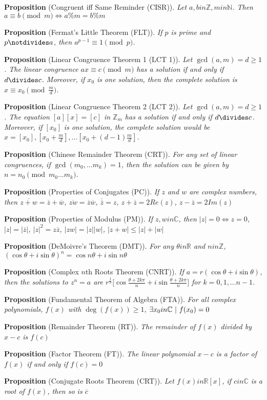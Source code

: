 \documentclass[12pt]{article}
\newcommand{\propositionlist}[2]{{\bf Proposition} (#1). \emph{#2}}
\begin{document}
\propositionlist{Congruent iff Same Reminder (CISR)}{Let $a,b in \mathbb{Z}, m in \mathbb{N}$. Then $a \equiv b \pmod m \iff a \% m = b \% m$}

\propositionlist{Fermat's Little Theorem (FLT)}{If $p$ is prime and $p \notdivides a$, then $a^{p-1} \equiv 1 \pmod p$.}

\propositionlist{Linear Congruence Theorem 1 (LCT 1)}{Let $\gcd(a,m) = d \geq 1$. The linear congruence $ax \equiv c \pmod m$ has a solution if and only if $d \divides c$. Moreover, if $x_0$ is one solution, then the complete solution is $x \equiv x_0 \pmod \frac{m}{d}$.}

\propositionlist{Linear Congruence Theorem 2 (LCT 2)}{Let $\gcd(a,m) = d \geq 1$. The equation $[a][x] = [c]$ in $\mathbb{Z}_m$ has a solution if and only if $d \divides c$. Moreover, if $[x_0]$ is one solution, the complete solution would be $x = [x_0], [x_0 + \frac{m}{d}], ... [x_0 + (d-1)\frac{m}{d}]$.}

\propositionlist{Chinese Remainder Theorem (CRT)}{For any set of linear congruences, if $\gcd(m_0,...m_k) = 1$, then the solution can be given by $n = n_0 \pmod {m_0...m_k}$.}

\propositionlist{Properties of Conjugates (PC)}{If $z$ and $w$ are complex numbers, then $\overline{z + w} = \overline{z} + \overline{w}$, $\overline{zw} = \overline{z}\overline{w}$, $\overline{\overline{z}} = z$, $z + \overline{z} = 2Re(z)$, $z - \overline{z} = 2Im(z)$}

\propositionlist{Properties of Modulus (PM)}{If $z, w in \mathbb{C}$, then $|z| = 0 \iff z = 0$, $|z| = |\overline{z}|$, ${|z|}^2 = z\overline{z}$, $|zw| = |z||w|$, $|z+w| \leq |z| + |w|$}

\propositionlist{DeMoivre's Theorem (DMT)}{For any $\theta in \mathbb{R}$ and $n in \mathbb{Z}$, $(\cos\theta + i\sin\theta)^n = \cos n\theta + i\sin n\theta$}

\propositionlist{Complex $n$th Roots Theorem (CNRT)}{If $a = r(\cos\theta + i\sin\theta)$, then the solutions to $z^n = a$ are $r^\frac{1}{n} \bigg[ \cos\frac{\theta + 2k\pi}{n} + i\sin\frac{\theta + 2k\pi}{n} \bigg]$ for $k = 0, 1, ... n-1$.}

\propositionlist{Fundamental Theorem of Algebra (FTA)}{For all complex polynomials, $f(x)$ with $\deg(f(x)) \geq 1$, $\exists x_0 in \mathbb{C} \ |\  f(x_0) = 0$}

\propositionlist{Remainder Theorem (RT)}{The remainder of $f(x)$ divided by $x-c$ is $f(c)$}

\propositionlist{Factor Theorem (FT)}{The linear polynomial $x-c$ is a factor of $f(x)$ if and only if $f(c) = 0$}

\propositionlist{Conjugate Roots Theorem (CRT)}{Let $f(x) in \mathbb{R}[x]$, if $c in \mathbb{C}$ is a root of $f(x)$, then so is $\overline{c}$}
\end{document}
